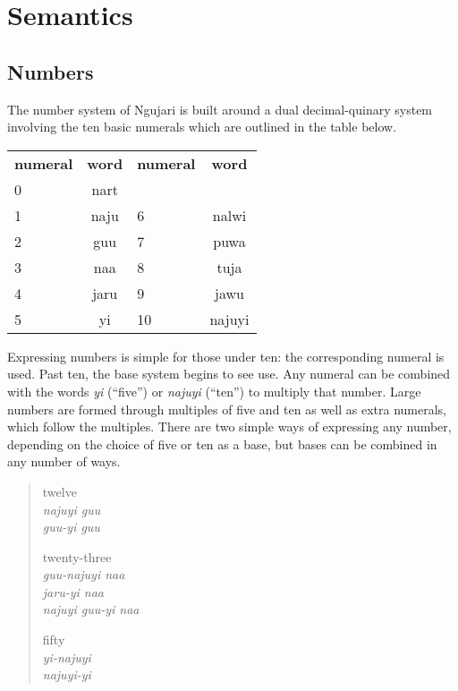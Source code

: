 \chapter{Semantics}

\section{Numbers}

The number system of Ngujari is built around a dual decimal-quinary system
involving the ten basic numerals which are outlined in the table below.

\begin{table}[h]
\centering
\begin{tabular}{lclc}
\textbf{numeral} & \textbf{word} & \textbf{numeral} & \textbf{word}\\
0 & nart & &\\
1 & naju & 6 & nalwi\\
2 & guu & 7 & puwa\\
3 & naa & 8 & tuja\\
4 & jaru & 9 & jawu\\
5 & yi & 10 & najuyi\\
\end{tabular}
\end{table}

Expressing numbers is simple for those under ten: the corresponding numeral is
used. Past ten, the base system begins to see use. Any numeral can be combined
with the words \textit{yi} (``five'') or \textit{najuyi} (``ten'') to multiply
that number. Large numbers are formed through multiples of five and ten as well
as extra numerals, which follow the multiples. There are two simple ways of
expressing any number, depending on the choice of five or ten as a base, but
bases can be combined in any number of ways.

\begin{quote}
\begin{multicols}{3}
twelve\\
\textit{najuyi guu}\\
\textit{guu-yi guu}

twenty-three\\
\textit{guu-najuyi naa}\\
\textit{jaru-yi naa}\\
\textit{najuyi guu-yi naa}

fifty\\
\textit{yi-najuyi}\\
\textit{najuyi-yi}\\
\end{multicols}
\end{quote}

